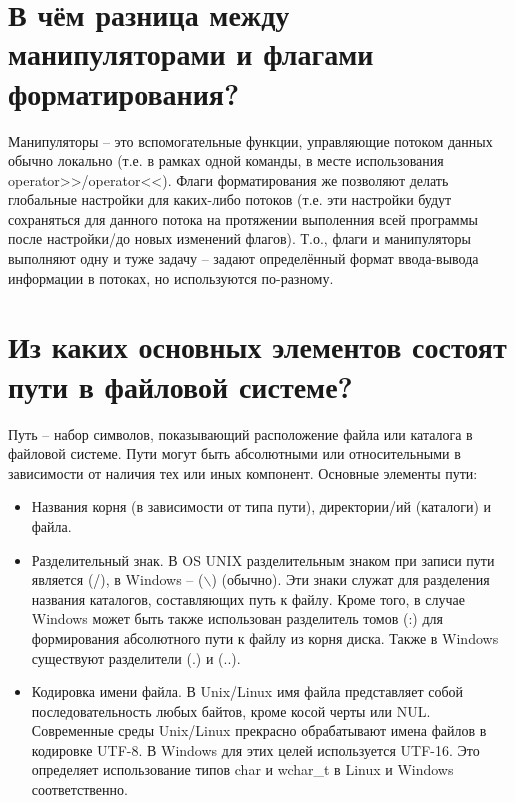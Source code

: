 \documentclass[a4paper,12pt]{article}	%
\begin{document}
\section{В чём разница между манипуляторами и флагами форматирования?}

	Манипуляторы -- это вспомогательные функции, управляющие потоком данных обычно локально (т.е. в рамках одной команды, в месте использования operator>>/operator<<). Флаги форматирования же позволяют делать глобальные настройки для каких-либо потоков (т.е. эти настройки будут сохраняться для данного потока на протяжении выполенния всей программы после настройки/до новых изменений флагов). Т.о., флаги и манипуляторы выполняют одну и туже задачу -- задают определённый формат ввода-вывода информации в потоках, но используются по-разному.

\section{Из каких основных элементов состоят пути в файловой системе?}

	Путь -- набор символов, показывающий расположение файла или каталога в файловой системе. Пути могут быть абсолютными или относительными в зависимости от наличия тех или иных компонент. Основные элементы пути:
	
	\begin{itemize}
	
		\item Названия корня (в зависимости от типа пути), директории/ий (каталоги) и файла.
	
		\item Разделительный знак. В OS UNIX разделительным знаком при записи пути является (/), в Windows -- ($\backslash$) (обычно). Эти знаки служат для разделения названия каталогов, составляющих путь к файлу. Кроме того, в случае Windows может быть также использован  разделитель томов (:) для формирования абсолютного пути к файлу из корня диска. Также в Windows существуют разделители (.) и (..).
	
		\item Кодировка имени файла. В Unix/Linux имя файла представляет собой последовательность любых байтов, кроме косой черты или NUL. Современные среды Unix/Linux прекрасно обрабатывают имена файлов в кодировке UTF-8. В Windows для этих целей используется UTF-16. Это определяет использование типов char и wchar\_t в Linux и Windows соответственно. 
	
	\end{itemize}
	
\end{document}
